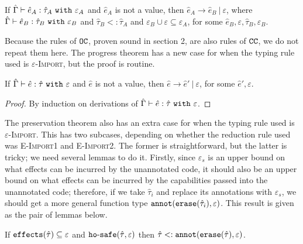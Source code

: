 \begin{theorem}
If $\hat \Gamma \vdash \hat e_A: \hat \tau_A~\mathtt{with}~ \varepsilon_A$ and $\hat e_A$ is not a value, then $\hat e_A \longrightarrow \hat e_B~|~\varepsilon$, where $\hat \Gamma \vdash \hat e_B: \hat \tau_B~\mathtt{with}~ \varepsilon_B$ and $\hat \tau_B <: \hat \tau_A$ and $\varepsilon_B \cup \varepsilon \subseteq \varepsilon_A$, for some $\hat e_B, \varepsilon, \hat \tau_B, \varepsilon_B$.
\end{theorem}

Because the rules of $\mathtt{OC}$, proven sound in section 2, are also rules of $\mathtt{CC}$, we do not repeat them here. The progress theorem has a new case for when the typing rule used is \textsc{$\varepsilon$-Import}, but the proof is routine.

\begin{theorem}
If $\hat \Gamma \vdash \hat e: \hat \tau~\mathtt{with}~ \varepsilon$ and $\hat e$ is not a value, then $\hat e \longrightarrow \hat e'~|~\varepsilon$, for some $\hat e', \varepsilon$.
\end{theorem}

\begin{proof} By induction on derivations of $\hat \Gamma \vdash \hat e: \hat \tau~\mathtt{with}~ \varepsilon$.
\end{proof}

The preservation theorem also has an extra case for when the typing rule used is \textsc{$\varepsilon$-Import}. This has two subcases, depending on whether the reduction rule used was \textsc{E-Import1} and \textsc{E-Import2}. The former is straightforward, but the latter is tricky; we need several lemmas to do it. Firstly, since $\varepsilon_s$ is an upper bound on what effects can be incurred by the unannotated code, it should also be an upper bound on what effects can be incurred by the capabilities passed into the unannotated code; therefore, if we take $\hat \tau_i$ and replace its annotations with $\varepsilon_s$, we should get a more general function type $\mathtt{annot}(\mathtt{erase}(\hat \tau_i), \varepsilon)$. This result is given as the pair of lemmas below.

\begin{lemma}
If $\mathtt{effects}(\hat \tau) \subseteq \varepsilon$ and $\mathtt{ho \hbox{-} safe}(\hat \tau, \varepsilon)$ then $\hat \tau <: \mathtt{annot}(\mathtt{erase}(\hat \tau), \varepsilon)$.
\end{lemma}

